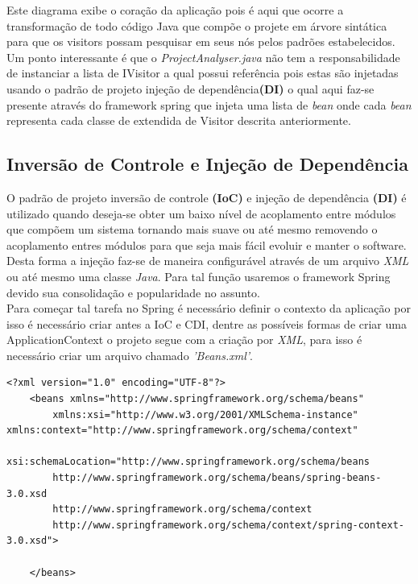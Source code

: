 Este diagrama exibe o coração da aplicação pois é aqui que ocorre a transformação de todo código Java que compõe o projete em árvore sintática para que os visitors\cite{Gamma:1995:DPE:186897} possam pesquisar em seus nós pelos padrões estabelecidos.\\

Um ponto interessante é que o \textit{ProjectAnalyser.java} não tem a responsabilidade de instanciar a lista de IVisitor a qual possui referência pois estas são injetadas usando o padrão de projeto injeção de dependência\textbf{(DI)} o qual aqui faz-se presente através do framework spring que injeta uma lista de \textit{bean} onde cada \textit{bean} representa cada classe de extendida de Visitor descrita anteriormente.\\

\clearpage


\subsection{Inversão de Controle e Injeção de Dependência}
O padrão de projeto inversão de controle \textbf{(IoC)} e injeção de dependência \textbf{(DI)} é utilizado quando deseja-se obter um baixo nível de acoplamento entre módulos que compõem um sistema tornando mais suave ou até mesmo removendo o acoplamento entres módulos para que seja mais fácil evoluir e manter o software. Desta forma a injeção faz-se de maneira configurável através de um arquivo \textit{XML} ou até mesmo uma classe \textit{Java}. Para tal função usaremos o framework Spring devido sua consolidação e popularidade no assunto.\\

Para começar tal tarefa no Spring é necessário definir  o contexto da aplicação por isso é necessário criar antes a IoC e CDI, dentre as possíveis formas de criar uma ApplicationContext o projeto segue com a criação por  \textit{XML}, para isso é necessário criar um arquivo chamado \textit{'Beans.xml'}.\\

\begin{lstlisting}
<?xml version="1.0" encoding="UTF-8"?>
	<beans xmlns="http://www.springframework.org/schema/beans"
		xmlns:xsi="http://www.w3.org/2001/XMLSchema-instance" xmlns:context="http://www.springframework.org/schema/context"
		xsi:schemaLocation="http://www.springframework.org/schema/beans 
		http://www.springframework.org/schema/beans/spring-beans-3.0.xsd
		http://www.springframework.org/schema/context 
		http://www.springframework.org/schema/context/spring-context-3.0.xsd">

	</beans>

\end{lstlisting}





